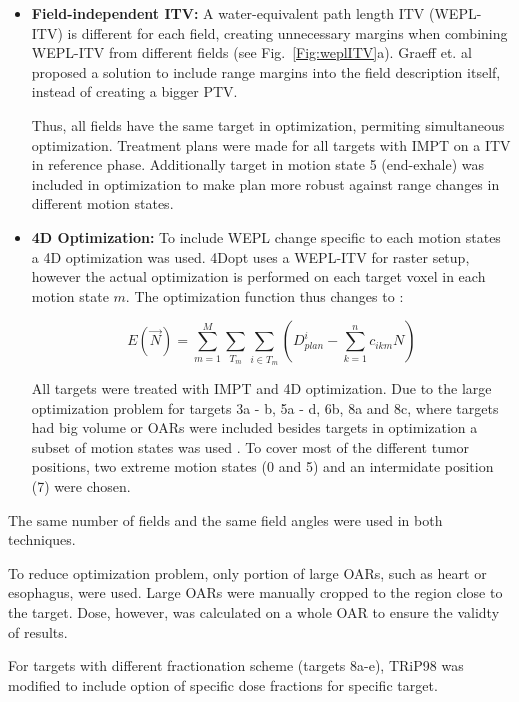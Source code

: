 \documentclass[type=dr, dr=rernat, accentcolor=tud7b,colorbacktitle, bigchapter, openright, twoside, 12pt ]{tudthesis}
\begin{document}
\begin{itemize}
\item \textbf{Field-independent ITV:} A water-equivalent path length ITV (WEPL-ITV) is different for each field, creating unnecessary margins when combining 
WEPL-ITV from different fields (see Fig.~\ref{Fig:weplITV}a). 
Graeff et. al \cite{Graeff2012} proposed a solution to include range margins into the field description itself, instead of creating a bigger PTV. 

Thus, all fields have the same target in optimization, permiting simultaneous optimization. 
Treatment plans were made for all targets with IMPT on a ITV in reference phase. Additionally target in motion state 5 (end-exhale) was included in optimization
to make plan more robust against range changes in different motion states.

\item \textbf{4D Optimization:} To include WEPL change specific to each motion states a 4D optimization was used. 4Dopt uses a WEPL-ITV for raster setup, 
however the actual optimization is performed on each target voxel in each motion state $m$. The optimization function thus changes to \cite{Graeff2012}:

\begin{equation}
E(\vec{N}) = \sum_{m=1}^{M}\sum_{T_m} \sum_{i\in T_m} \left( D_{plan}^{i} -\sum_{k=1}^n c_{ikm}N\right)
\end{equation}

All targets were treated with IMPT and 4D optimization. Due to the large optimization problem for targets 3a - b, 5a - d, 6b, 8a and 8c, where targets had big volume or 
OARs were included besides targets in optimization a subset of motion states was used \cite{Graeff2012}. 
To cover most of the different tumor positions, two extreme motion states (0 and 5) and an intermidate position (7) were chosen.

\end{itemize}

The same number of fields and the same field angles were used in both techniques.

To reduce optimization problem, only portion of large OARs, such as heart or esophagus, were used. Large OARs were manually cropped to the region close to the 
target. Dose, however, was calculated on a whole OAR to ensure the validty of results.

For targets with different fractionation scheme (targets 8a-e), TRiP98 was modified to include option of specific dose fractions for specific target.
\end{document}

